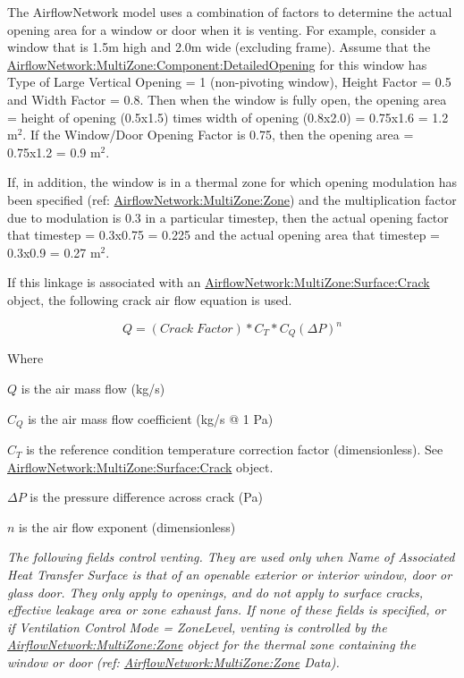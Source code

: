The AirflowNetwork model uses a combination of factors to determine the actual opening area for a window or door when it is venting. For example, consider a window that is 1.5m high and 2.0m wide (excluding frame). Assume that the \hyperref[airflownetworkmultizonecomponentdetailedopening]{AirflowNetwork:MultiZone:Component:DetailedOpening} for this window has Type of Large Vertical Opening = 1 (non-pivoting window), Height Factor = 0.5 and Width Factor = 0.8. Then when the window is fully open, the opening area = height of opening (0.5x1.5) times width of opening (0.8x2.0) = 0.75x1.6 = 1.2 m\(^{2}\). If the Window/Door Opening Factor is 0.75, then the opening area = 0.75x1.2 = 0.9 m\(^{2}\).

If, in addition, the window is in a thermal zone for which opening modulation has been specified (ref: \hyperref[airflownetworkmultizonezone]{AirflowNetwork:MultiZone:Zone}) and the multiplication factor due to modulation is 0.3 in a particular timestep, then the actual opening factor that timestep = 0.3x0.75 = 0.225 and the actual opening area that timestep = 0.3x0.9 = 0.27 m\(^{2}\).

If this linkage is associated with an \hyperref[airflownetworkmultizonesurfacecrack]{AirflowNetwork:MultiZone:Surface:Crack} object, the following crack air flow equation is used.

\begin{equation}
Q = \left( Crack\;Factor \right) * C_T * C_Q \left( \Delta P \right)^{n}
\end{equation}

Where

$Q$ is the air mass flow (kg/s)

$C_Q$ is the air mass flow coefficient (kg/s @ 1 Pa)

$C_T$ is the reference condition temperature correction factor (dimensionless). See \hyperref[airflownetworkmultizonesurfacecrack]{AirflowNetwork:MultiZone:Surface:Crack} object.

$\Delta P$ is the pressure difference across crack (Pa)

$n$ is the air flow exponent (dimensionless)

\emph{The following fields control venting. They are used only when Name of Associated Heat Transfer Surface is that of an openable exterior or interior window, door or glass door. They only apply to openings, and do not apply to surface cracks, effective leakage area or zone exhaust fans. If none of these fields is specified, or if Ventilation Control Mode = ZoneLevel, venting is controlled by the \hyperref[airflownetworkmultizonezone]{AirflowNetwork:MultiZone:Zone} object for the thermal zone containing the window or door (ref: \hyperref[airflownetworkmultizonezone]{AirflowNetwork:MultiZone:Zone} Data).}

